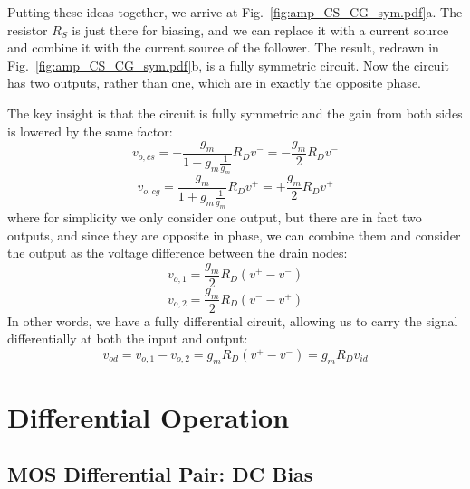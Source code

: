 Putting these ideas together, we arrive at Fig.~\ref{fig:amp_CS_CG_sym.pdf}a.  The resistor $R_S$ is just there for biasing, and we can replace it with a current source and combine it with the current source of the follower.  The result, redrawn in Fig.~\ref{fig:amp_CS_CG_sym.pdf}b, is a fully symmetric circuit.  Now the circuit has two outputs, rather than one, which are in exactly the opposite phase.  

The key insight is that the circuit is fully symmetric and the gain from both sides is lowered by the same factor:
%
\begin{equation}
	v_{o,cs} = -\frac{g_m}{1+g_m \frac{1}{g_m} } R_D v^- = -\frac{g_m}{2} R_D v^-   
\end{equation}
\begin{equation}
	v_{o,cg} = \frac{g_m}{1+g_m \frac{1}{g_m} } R_D v^+ = +\frac{g_m}{2} R_D v^+   
\end{equation}
%
where for simplicity we only consider one output, but there are in fact two outputs, and since they are opposite in phase, we can combine them and consider the output as the voltage difference between the drain nodes:
%
\begin{equation}
	v_{o,1} = \frac{g_m}{2} R_D (v^+ - v^-)  
\end{equation}
%
\begin{equation}
	v_{o,2} = \frac{g_m}{2} R_D (v^- - v^+)  
\end{equation}
%
In other words, we have a fully differential circuit, allowing us to carry the signal differentially at both the input and output:
%
\begin{equation}
	v_{od} = v_{o,1} - v_{o,2} = g_m R_D (v^+ - v^-) = g_m R_D v_{id}  
\end{equation}





\section{Differential Operation}



\subsection{MOS Differential Pair:  DC Bias}



